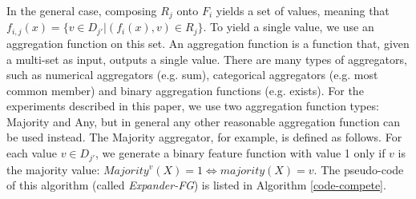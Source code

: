 \documentclass[twoside,11pt]{article}
\theoremstyle{definition}
\begin{document}

In the general case, composing $R_j$ onto $F_i$ yields a set of values, meaning that $f_{i,j}(x)=\{v\in D_{j'}|(f_i(x),v)\in R_j\}$. 
To yield a single value, we use an aggregation function on this set.
An aggregation function is a function that, given a multi-set as input, outputs a single value. There are many types of aggregators, such as numerical aggregators (e.g. sum), categorical aggregators (e.g. most common member) and binary aggregation functions (e.g. exists).
For the experiments described in this paper, we use  
two aggregation function types: Majority and Any, but in general any other reasonable aggregation function can be used instead.
The Majority aggregator, for example, is defined as follows.  For each value $v\in D_{j'}$, we generate a binary feature function with value 1 only if $v$ is the majority value: 
$Majority^v(X)=1 \iff majority(X)=v$.
The pseudo-code of this algorithm (called   
\emph{Expander-FG}) is listed in Algorithm \ref{code-compete}.

\end{document}
